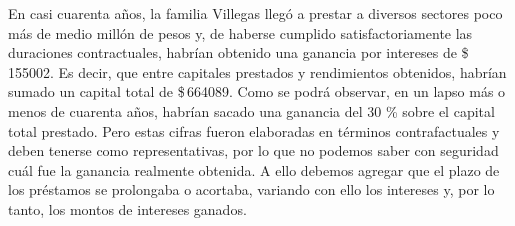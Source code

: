 \documentclass[14pt,twoside,final]{extbook} %
\begin{document}
En casi cuarenta años, la familia Villegas llegó a prestar a diversos sectores poco más de medio millón de pesos y, de haberse cumplido satisfactoriamente las duraciones contractuales, habrían obtenido una ganancia por intereses de \$\,155002. Es decir, que entre capitales prestados y rendimientos obtenidos, habrían sumado un capital total de \$\,664089. Como se podrá observar, en un lapso más o menos de cuarenta años, habrían sacado una ganancia del 30 \% sobre el capital total prestado. Pero estas cifras fueron elaboradas en términos contrafactuales y deben tenerse como representativas, por lo que no podemos saber con seguridad cuál fue la ganancia realmente obtenida. A
ello debemos agregar que el plazo de los préstamos se prolongaba o acortaba, variando con ello los intereses y, por lo tanto, los montos de intereses ganados.
\end{document}
